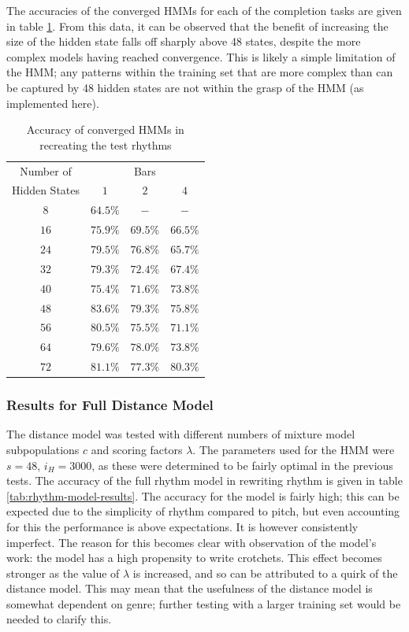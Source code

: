 \documentclass[ author={Stephen Livermore-Tozer},
				supervisor={Dr. Peter Flach},
				degree={MEng},
				title={Algorithmic Co-composition Using Machine Learning},
				subtitle={},
				type={research},
				year={2016} ]{dissertation}
\begin{document}
	The accuracies of the converged HMMs for each of the completion tasks are given in table \ref{tab:hmm-results}. From this data, it can be observed that the benefit of increasing the size of the hidden state falls off sharply above 48 states, despite the more complex models having reached convergence. This is likely a simple limitation of the HMM; any patterns within the training set that are more complex than can be captured by 48 hidden states are not within the grasp of the HMM (as implemented here).
	
	\begin{table}[h]
		\begin{center}
			\begin{tabular}{cccc}
				\toprule
				Number of& \multicolumn{3}{c}{Bars}\\
				\cline{2-4}
				Hidden States& $1$ & $2$ & $4$\\
				\hline
				$8$ & $64.5\%$ & $-$ & $-$\\
				$16$ & $75.9\%$ & $69.5\%$ & $66.5\%$\\
				$24$ & $79.5\%$ & $76.8\%$ & $65.7\%$\\
				$32$ & $79.3\%$ & $72.4\%$ & $67.4\%$\\
				$40$ & $75.4\%$ & $71.6\%$ & $73.8\%$\\
				$48$ & $83.6\%$ & $79.3\%$ & $75.8\%$\\
				$56$ & $80.5\%$ & $75.5\%$ & $71.1\%$\\
				$64$ & $79.6\%$ & $78.0\%$ & $73.8\%$\\
				$72$ & $81.1\%$ & $77.3\%$ & $80.3\%$\\
				\bottomrule
			\end{tabular}
		\end{center}
		\caption{Accuracy of converged HMMs in recreating the test rhythms}
		\label{tab:hmm-results}
	\end{table}
	
	\subsubsection{Results for Full Distance Model}
	
	The distance model was tested with different numbers of mixture model subpopulations $c$ and scoring factors $\lambda$. The parameters used for the HMM were $s = 48$, $i_H = 3000$, as these were determined to be fairly optimal in the previous tests. The accuracy of the full rhythm model in rewriting rhythm is given in table \ref{tab:rhythm-model-results}. The accuracy for the model is fairly high; this can be expected due to the simplicity of rhythm compared to pitch, but even accounting for this the performance is above expectations. It is however consistently imperfect. The reason for this becomes clear with observation of the model's work: the model has a high propensity to write crotchets. This effect becomes stronger as the value of $\lambda$ is increased, and so can be attributed to a quirk of the distance model. This may mean that the usefulness of the distance model is somewhat dependent on genre; further testing with a larger training set would be needed to clarify this.
	
\end{document}
